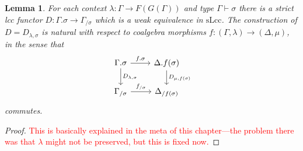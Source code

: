 \documentclass{article}
\newcommand{\todo}[1]{\textcolor{red}{#1}}
\newtheorem{lemma}{Lemma}
\begin{document}
\begin{lemma}
  \label{lem:extension-to-slice}
  For each context $\lambda : \Gamma \rightarrow F(G(\Gamma))$ and type $\Gamma \vdash \sigma$ there is a strict lcc functor $D : \Gamma.\sigma \rightarrow \Gamma_{/ \sigma}$ which is a weak equivalence in $\mathrm{sLcc}$.
  The construction of $D = D_{\lambda, \sigma}$ is natural with respect to coalgebra morphisms $f : (\Gamma, \lambda) \rightarrow (\Delta, \mu)$, in the sense that
  \begin{equation}
    \begin{tikzcd}
      \Gamma.\sigma \arrow[d, "D_{\lambda, \sigma}"] \arrow[r, "f.\sigma"] & \Delta.f(\sigma) \arrow[d, "D_{\mu, f(\sigma)}"] \\
      \Gamma_{/ \sigma} \arrow[r, "f_{/ \sigma}"] & \Delta_{/ f(\sigma)}
    \end{tikzcd}
  \end{equation}
  commutes.
\end{lemma}
\begin{proof}
  \todo{This is basically explained in the meta of this chapter---the problem there was that $\lambda$ might not be preserved, but this is fixed now.}
\end{proof}
\end{document}
